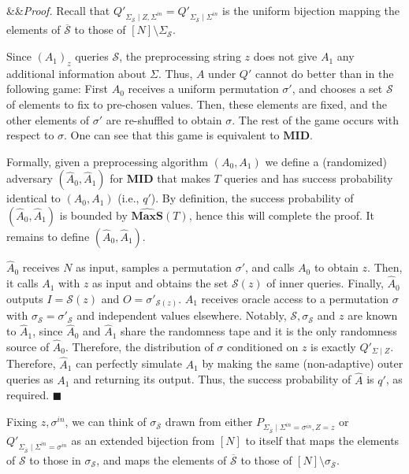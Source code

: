 \documentclass[11pt]{article}
\renewenvironment{proof}[1][]
    {\noindent
       \ifx&#1&{\it Proof.}
       \else{\it Proof ({#1}).}
       \fi}{\hfill $\blacksquare$}
\newcommand{\MID}{\boldsymbol{MID}}
\newcommand{\INP}{I}
\newcommand{\OUTP}{O}
\newcommand{\MAXS}{\boldsymbol{MaxS}}
\begin{document}
\begin{proof}
Recall that $Q'_{\Sigma_{\overline{\mathcal{S}}} \mid Z, \Sigma^{in} } =
Q'_{\Sigma_{\overline{\mathcal{S}}} \mid  \Sigma^{in} }$
is the uniform bijection mapping the elements of $\overline{\mathcal{S}}$ to those of $[N] \setminus \Sigma_{\mathcal{S}}$.

Since $(A_1)_z$ queries $\mathcal{S}$, the preprocessing string $z$ does not give $A_1$ any additional information about 
$\Sigma$. Thus, $A$ under $Q'$ cannot do better than in the following game: First $A_0$ receives a uniform permutation $\sigma'$, and chooses a set $\mathcal{S}$ of elements to fix to pre-chosen values. Then, these elements are fixed, and the other elements of $\sigma'$ are re-shuffled to obtain $\sigma$. The rest of the game occurs with respect to $\sigma$. One can see that this game is equivalent to $\MID$.
 
Formally, given a preprocessing algorithm $(A_0,A_1)$ we define a (randomized) adversary $(\widehat{A}_0, \widehat{A}_1)$ for $\MID$
that makes $T$ queries and has success probability identical to $(A_0,A_1)$ (i.e., $q'$). By definition, 
the success probability of $(\widehat{A}_0, \widehat{A}_1)$ is bounded by $\widehat{\MAXS}(T)$, hence this will complete the proof.
It remains to define $(\widehat{A}_0, \widehat{A}_1)$. 

$\widehat{A}_0$ receives $N$ as input, samples a permutation $\sigma'$, and calls $A_0$ to obtain $z$. Then, it calls $A_1$ with $z$ as input and obtains the set $\mathcal{S}(z)$ of inner queries. Finally, $\widehat{A}_0$ outputs $\INP = \mathcal{S}(z)$ and $\OUTP = \sigma'_{\mathcal{S}(z)}$. $\widehat{A}_1$ receives oracle access to a permutation $\sigma$ with $\sigma_{\mathcal{S}} = \sigma'_{\mathcal{S}}$ and independent values elsewhere. Notably, $\mathcal{S},\sigma_{\mathcal{S}}$ and $z$ are known to $\widehat{A}_1$, since $\widehat{A}_0$ and $\widehat{A}_1$ share the randomness tape and it is the only randomness source of $\widehat{A}_0$. Therefore, the distribution of $\sigma$ conditioned on $z$ is exactly $Q'_{\Sigma \mid Z}$. Therefore, $\widehat{A}_1$ can perfectly simulate $A_1$ by making the same (non-adaptive) outer queries as $A_1$ 
and returning its output. Thus, the success probability of $\widehat{A}$ is $q'$, as required.
\end{proof}

Fixing $z,\sigma^{in}$,
we can think of $\sigma_{\overline{\mathcal{S}}}$ drawn from either 
$P_{ \Sigma_{\overline{\mathcal{S}}} \mid  \Sigma^{in} = \sigma^{in}, Z = z}$
or 
$Q'_{ \Sigma_{\overline{\mathcal{S}}} \mid \Sigma^{in} = \sigma^{in}}$
as an extended bijection from $[N]$ to itself that maps the elements of $\mathcal{S}$ to those in $\sigma_{\mathcal{S}}$,
and maps the elements of $\overline{\mathcal{S}}$ to those of $[N] \setminus \sigma_{\overline{\mathcal{S}}}$.
\end{document}
